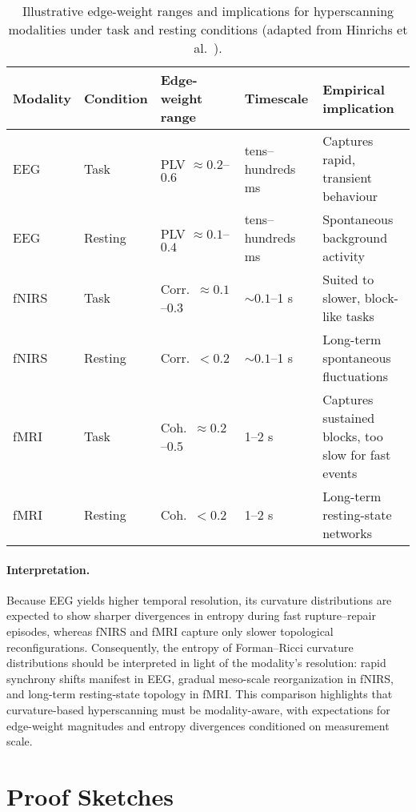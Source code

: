\documentclass{article}
\theoremstyle{definition}
\begin{document}
\begin{table}[H]
\centering
\caption{Illustrative edge-weight ranges and implications for hyperscanning modalities under task and resting conditions (adapted from Hinrichs et al.~\cite{hinrichs2025geometry}).}
\label{tab:modality-comparison}
\begin{tabularx}{\textwidth}{@{}p{1.5cm} p{1.8cm} p{2.5cm} p{2cm} X@{}}
\toprule
\textbf{Modality} & \textbf{Condition} & \textbf{Edge-weight range} & \textbf{Timescale} & \textbf{Empirical implication} \\
\midrule
EEG   & Task    & PLV $\approx 0.2$--$0.6$ & tens--hundreds ms & Captures rapid, transient behaviour \\
EEG   & Resting & PLV $\approx 0.1$--$0.4$ & tens--hundreds ms & Spontaneous background activity \\
\addlinespace
fNIRS & Task    & Corr.\ $\approx 0.1$--$0.3$ & $\sim 0.1$--1 s & Suited to slower, block-like tasks \\
fNIRS & Resting & Corr.\ $< 0.2$ & $\sim 0.1$--1 s & Long-term spontaneous fluctuations \\
\addlinespace
fMRI  & Task    & Coh.\ $\approx 0.2$--$0.5$ & 1--2 s & Captures sustained blocks, too slow for fast events \\
fMRI  & Resting & Coh.\ $< 0.2$ & 1--2 s & Long-term resting-state networks \\
\bottomrule
\end{tabularx}
\end{table}


\paragraph{Interpretation.}
Because EEG yields higher temporal resolution, its curvature distributions are
expected to show sharper divergences in entropy during fast rupture--repair
episodes, whereas fNIRS and fMRI capture only slower topological reconfigurations.
Consequently, the entropy of Forman--Ricci curvature distributions should be
interpreted in light of the modality’s resolution: rapid synchrony shifts
manifest in EEG, gradual meso-scale reorganization in fNIRS, and long-term
resting-state topology in fMRI. This comparison highlights that curvature-based
hyperscanning must be modality-aware, with expectations for edge-weight
magnitudes and entropy divergences conditioned on measurement scale.

\section{Proof Sketches}
\label{sec:proof-sketches}
\end{document}
